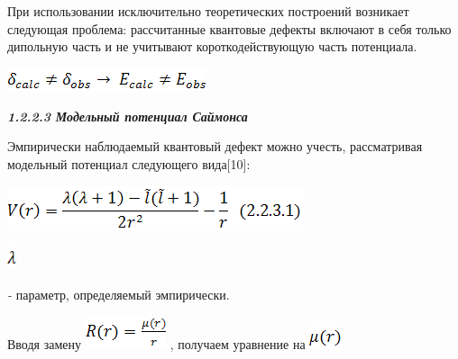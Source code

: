 \documentclass{article}
\begin{document}
\vspace{10pt}
{\large{}При использовании исключительно теоретических 
построений возникает следующая проблема: рассчитанные 
квантовые дефекты включают в себя только дипольную 
часть и не учитывают короткодействующую часть 
потенциала.}

\vspace{10pt}
\includegraphics[width=166pt, height=19pt, keepaspectratio=true]{3-fig026.png}

\label{HToc453749986}

\vspace{28pt}
\baselineskip=13pt
{\color{color17} \textit{\textbf{1.2.2.3 Модельный потенциал 
Саймонса }}}

\vspace{10pt}
\baselineskip=18pt
{\large{}Эмпирически наблюдаемый квантовый дефект 
можно учесть, рассматривая модельный потенциал 
следующего вида[10]:}

\vspace{10pt}
\includegraphics[width=247pt, height=37pt, keepaspectratio=true]{3-fig027.png}

\vspace{28pt}
\includegraphics[width=8pt, height=19pt, keepaspectratio=true]{3-fig028.png}

 

\vspace{10pt}
\parindent=3pt
{\large{}\textit{- }}{\large{}параметр, определяемый эмпирически.}

\vspace{10pt}
\parindent=0pt
{\large{}Вводя замену }
\includegraphics[width=67pt, height=27pt, keepaspectratio=true]{3-fig029.png}
{\large{}, получаем уравнение на }
\includegraphics[width=27pt, height=19pt, keepaspectratio=true]{3-fig030.png}
\end{document}

